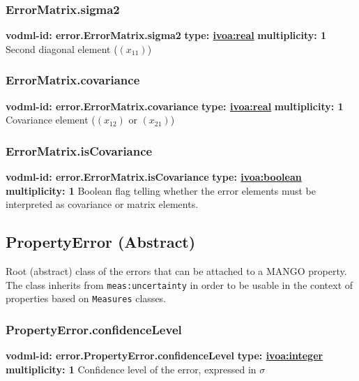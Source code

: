    \subsubsection{ErrorMatrix.sigma2}
      \textbf{vodml-id: error.ErrorMatrix.sigma2} \newline
      \textbf{type: \hyperref[sect:ivoa]{ivoa:real}} \newline
      \textbf{multiplicity: 1} \newline 
      Second diagonal element ($(x_{11})$)

    \subsubsection{ErrorMatrix.covariance}
      \textbf{vodml-id: error.ErrorMatrix.covariance} \newline
      \textbf{type: \hyperref[sect:ivoa]{ivoa:real}} \newline
      \textbf{multiplicity: 1} \newline 
      Covariance element ($(x_{12})$ or $(x_{21})$)

    \subsubsection{ErrorMatrix.isCovariance}
      \textbf{vodml-id: error.ErrorMatrix.isCovariance} \newline
      \textbf{type: \hyperref[sect:ivoa]{ivoa:boolean}} \newline
      \textbf{multiplicity: 1} \newline 
      Boolean flag telling whether the error elements must be interpreted as covariance or matrix elements.

  \subsection{PropertyError (Abstract)}
  \label{sect:error.PropertyError}
    Root (abstract) class of the errors that can be attached to a MANGO property. The class inherits from \texttt{meas:uncertainty} in order to be usable in the context of properties based on \texttt{Measures} classes.

    \subsubsection{PropertyError.confidenceLevel}
      \textbf{vodml-id: error.PropertyError.confidenceLevel} \newline
      \textbf{type: \hyperref[sect:ivoa]{ivoa:integer}} \newline
      \textbf{multiplicity: 1} \newline 
      Confidence level of the error, expressed in $\sigma$

